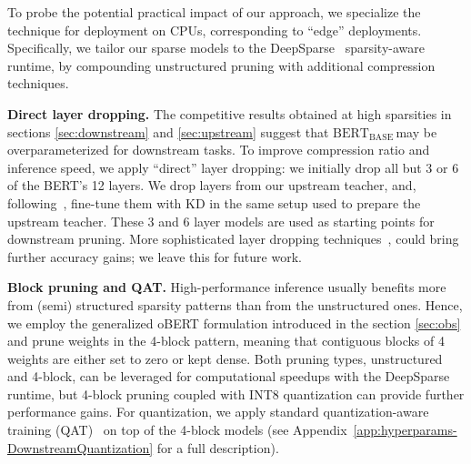 \documentclass[11pt]{article}
\newcommand{\bert}{$\textrm{BERT}_{\textrm{BASE}}\,$}
\begin{document}
To probe the potential practical impact of our approach, we specialize the technique for deployment on CPUs, corresponding to ``edge'' deployments. Specifically, we tailor our sparse models to the DeepSparse~\cite{deepsparse} sparsity-aware runtime, by compounding unstructured pruning with additional compression techniques.  

\noindent\textbf{Direct layer dropping.} The competitive results obtained at high sparsities in sections \ref{sec:downstream} and \ref{sec:upstream} suggest that \bert may be overparameterized for downstream tasks. To improve compression ratio and inference speed, we apply ``direct'' layer dropping: we initially drop all but 3 or 6 of the BERT's 12 layers. We drop layers from our upstream teacher, and, following~\cite{Turc2019WellReadSL}, fine-tune them with KD in the same setup used to prepare the upstream teacher. These 3 and 6 layer models are used as starting points for downstream pruning. More sophisticated layer dropping techniques~\cite{fan2019reducing}, could bring further accuracy gains; we leave this for future work.

\noindent\textbf{Block pruning and QAT.} High-performance inference usually benefits more from (semi) structured sparsity patterns than from the unstructured ones. Hence, we employ the generalized oBERT formulation introduced in the section \ref{sec:obs} and prune weights in the 4-block pattern, meaning that contiguous blocks of 4 weights are either set to zero or kept dense. Both pruning types, unstructured and 4-block, can be leveraged for computational speedups with the DeepSparse runtime, but 4-block pruning coupled with INT8 quantization can provide further performance gains. For quantization, we apply standard quantization-aware training (QAT)~\cite{jacob2018quantization} on top of the 4-block models (see Appendix~\ref{app:hyperparams-DownstreamQuantization} for a full description).
\end{document}
